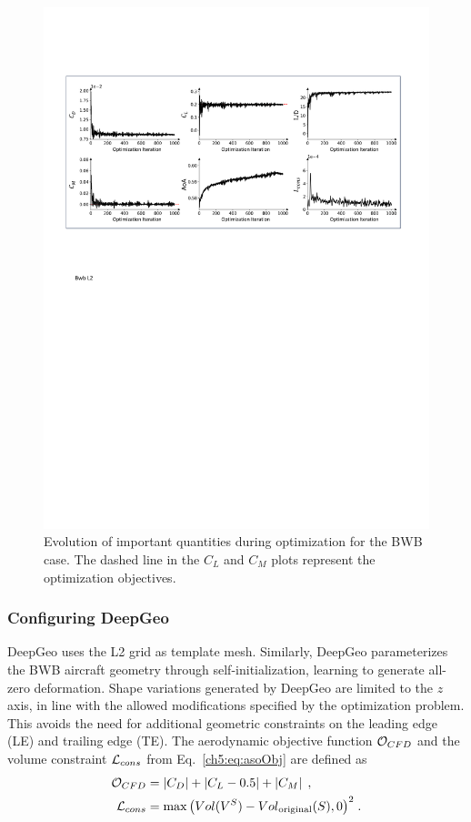 \begin{figure}[htb]
    \begin{center}
        \includegraphics[width=1\linewidth]{chapter5/fig/bwb_L2_optim_history.pdf}
    \end{center}
    \vspace{-7mm}
    \caption{
        \small Evolution of important quantities during optimization for the BWB case. The dashed line in the $C_L$ and $C_M$ plots represent the optimization objectives.
    }
    \label{ch5:fig:cs3_history}
\end{figure}

\subsubsection{Configuring DeepGeo}

DeepGeo uses the L2 grid as template mesh. Similarly, DeepGeo parameterizes the BWB aircraft geometry through self-initialization, learning to generate all-zero deformation. 
Shape variations generated by DeepGeo are limited to the $z$ axis, in line with the allowed modifications specified by the optimization problem. This avoids the need for additional geometric constraints on the leading edge (LE) and trailing edge (TE).
The aerodynamic objective function $\mathcal{O}_{CFD}$ and the volume constraint $\mathcal{L}_{cons}$ from Eq.~\ref{ch5:eq:asoObj} are defined as
%
\begin{align}
 \mathcal{O}_{CFD} &= \left| C_D \right| + \left| C_L-0.5 \right| + \left| C_M \right| \; , \\
 \mathcal{L}_{cons} & = {\max \left(Vol(V^S)-{Vol}_\text{original}(S), 0\right)} ^2 \; .
\end{align}
%

